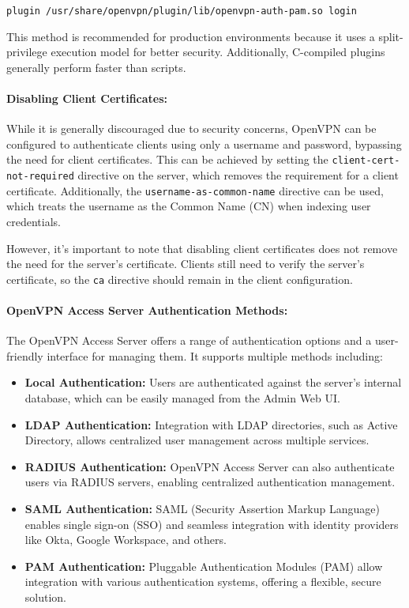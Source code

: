 \begin{verbatim}
plugin /usr/share/openvpn/plugin/lib/openvpn-auth-pam.so login
\end{verbatim}

This method is recommended for production environments because it uses a split-privilege execution model for better security. Additionally, C-compiled plugins generally perform faster than scripts.

\paragraph{Disabling Client Certificates:}  
While it is generally discouraged due to security concerns, OpenVPN can be configured to authenticate clients using only a username and password, bypassing the need for client certificates. This can be achieved by setting the \texttt{client-cert-not-required} directive on the server, which removes the requirement for a client certificate. Additionally, the \texttt{username-as-common-name} directive can be used, which treats the username as the Common Name (CN) when indexing user credentials.

However, it's important to note that disabling client certificates does not remove the need for the server's certificate. Clients still need to verify the server's certificate, so the \texttt{ca} directive should remain in the client configuration.

\paragraph{OpenVPN Access Server Authentication Methods:}  
The OpenVPN Access Server offers a range of authentication options and a user-friendly interface for managing them. It supports multiple methods including:

\begin{itemize}
    \item \textbf{Local Authentication:} Users are authenticated against the server's internal database, which can be easily managed from the Admin Web UI.
    
    \item \textbf{LDAP Authentication:} Integration with LDAP directories, such as Active Directory, allows centralized user management across multiple services.
    
    \item \textbf{RADIUS Authentication:} OpenVPN Access Server can also authenticate users via RADIUS servers, enabling centralized authentication management.
    
    \item \textbf{SAML Authentication:} SAML (Security Assertion Markup Language) enables single sign-on (SSO) and seamless integration with identity providers like Okta, Google Workspace, and others.
    
    \item \textbf{PAM Authentication:} Pluggable Authentication Modules (PAM) allow integration with various authentication systems, offering a flexible, secure solution.
\end{itemize}

